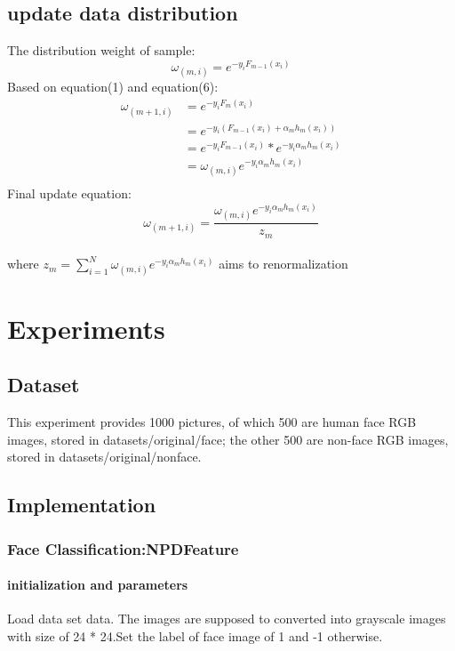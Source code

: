 \documentclass[journal, a4paper]{IEEEtran}
\begin{document}
\subsection{update data distribution}
The distribution weight of sample:
\begin{equation}
\omega_{(m,i)}=e^{-y_{i}F_{m-1}(x_{i})}
\end{equation}
Based on equation(1) and equation(6):
\begin{equation}
\begin{aligned}
\omega_{(m+1,i)}&=e^{-y_{i}F_{m}(x_{i})}\\&=e^{-y_{i}(F_{m-1}(x_{i})+\alpha _{m}h_{m}(x_{i}))}\\&=e^{-y_{i}F_{m-1}(x_{i})}*e^{-y_{i}\alpha_{m}h_{m}(x_{i})}\\&=\omega_{(m,i)}e^{-y_{i}\alpha_{m}h_{m}(x_{i})}\\
\end{aligned}
\end{equation}
Final update equation:
\begin{equation}
\omega_{(m+1,i)}=\dfrac{\omega_{(m,i)}e^{-y_{i}\alpha_{m}h_{m}(x_{i})}}{z_{m}}
\end{equation}
\\
where $z_{m}=\sum_{i=1}^{N}\omega_{(m,i)}e^{-y_{i}\alpha_{m}h_{m}(x_{i})}$ aims to renormalization


\section{Experiments}
\subsection{Dataset}
This experiment provides 1000 pictures, of which 500 are human face RGB images, stored in datasets/original/face; the other 500 are non-face RGB images, stored in datasets/original/nonface.

\subsection{Implementation}
\subsubsection{Face Classification:NPDFeature}
\paragraph{initialization and parameters}
Load data set data. The images are supposed to converted into grayscale images with size of 24 * 24.Set the label of face image of 1 and -1 otherwise.
\end{document}

